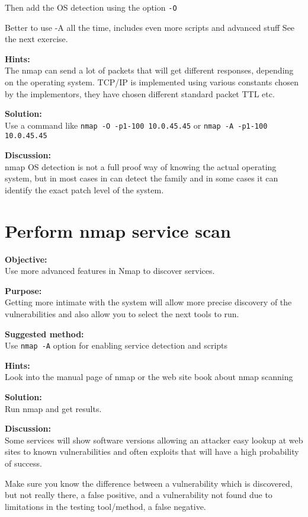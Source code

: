 \documentclass[a4paper,11pt,notitlepage]{report}
\begin{document}
Then add the OS detection using the option \verb+-O+

Better to use -A all the time, includes even more scripts and advanced stuff
See the next exercise.

{\bf Hints:} \\

The nmap can send a lot of packets that will get different responses, depending on the operating system. TCP/IP is implemented using various constants chosen by the implementors, they have chosen different standard packet TTL etc.

{\bf Solution:}\\
Use a command like \verb+nmap -O -p1-100 10.0.45.45+ or  \verb+nmap -A -p1-100 10.0.45.45+


{\bf Discussion:}\\
nmap OS detection is not a full proof way of knowing the actual operating system, but in most cases in can detect the family and in some cases it can identify the exact patch level of the system.

\chapter{Perform nmap service scan}
\label{ex:nmap-service}

{\bf Objective:} \\
Use more advanced features in Nmap to discover services.

{\bf Purpose:}\\
Getting more intimate with the system will allow more precise discovery of the vulnerabilities and also allow you to select the next tools to run.

{\bf Suggested method:}\\
Use \verb+nmap -A+ option for enabling service detection and scripts

{\bf Hints:} \\
Look into the manual page of nmap or the web site book about nmap scanning

{\bf Solution:}\\
Run nmap and get results.

{\bf Discussion:}\\

Some services will show software versions allowing an attacker easy lookup at web sites to known vulnerabilities and often exploits that will have a high probability of success.

Make sure you know the difference between a vulnerability which is discovered, but not really there, a false positive, and a vulnerability not found due to limitations in the testing tool/method, a false negative.
\end{document}

